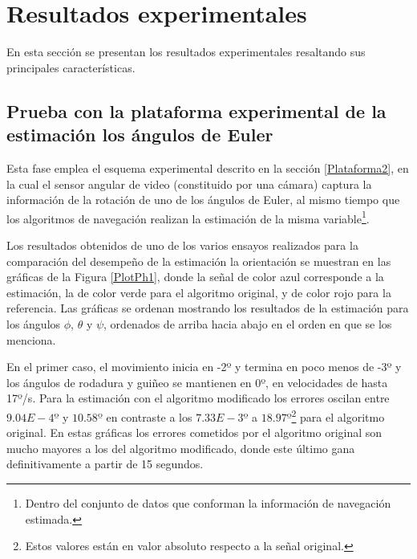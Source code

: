 \documentclass[conference]{IEEEtran}
\begin{document}
\section{Resultados experimentales}\label{experimentation}
En esta sección se presentan los resultados experimentales resaltando sus principales características.
\subsection{Prueba con la plataforma experimental de la estimación los ángulos de Euler}
Esta fase emplea el esquema experimental descrito en la sección \ref{Plataforma2}, en la cual el sensor angular de video (constituido por una cámara) captura la información de la rotación de uno de los ángulos de Euler, al mismo tiempo que los algoritmos de navegación realizan la estimación de la misma variable\footnote{Dentro del conjunto de datos que conforman la información de navegación estimada.}.\par
Los resultados obtenidos de uno de los varios ensayos realizados para la comparación del desempeño de la estimación la orientación se muestran en las gráficas de la Figura \ref{PlotPh1}, donde la señal de color azul corresponde a la estimación, la de color verde para el algoritmo original, y de color rojo para la referencia. Las gráficas se ordenan mostrando los resultados de la estimación para los ángulos $\phi$, $\theta$ y $\psi$, ordenados de arriba hacia abajo en el orden en que se los menciona.\par
En el primer caso, el movimiento inicia en -2º y termina en poco menos de -3º y los ángulos de rodadura y guiñeo se mantienen en 0º, en velocidades de hasta 17º/s. Para la estimación con el algoritmo modificado los errores oscilan entre $9.04E-4º$ y $10.58º$ en contraste a los $7.33E-3º$ a $18.97º$\footnote{Estos valores están en valor absoluto respecto a la señal original.} para el algoritmo original. 
En estas gráficas los errores cometidos por el algoritmo original son mucho mayores a los del algoritmo modificado, donde este último gana definitivamente a partir de 15 segundos.\par
\end{document}
